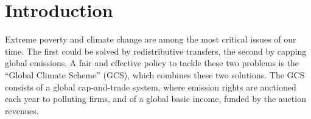 \tableofcontents

\onehalfspacing %

\section{Introduction}  %


Extreme poverty and climate change are among the most critical issues of our time. The first could be solved by redistributive transfers, the second by capping global emissions. %
A fair and effective policy to tackle these two problems is the ``Global Climate Scheme'' (GCS), which combines these two solutions. The GCS consists of a global cap-and-trade system, where emission rights are auctioned each year to polluting firms, and of a global basic income, funded by the auction revenues. 

